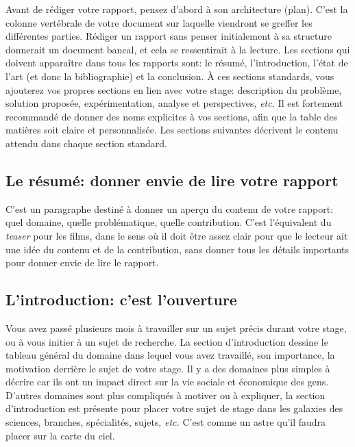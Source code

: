 \documentclass{rapport}
\def\etc{\textit{etc.}\xspace}
\begin{document}
      Avant de rédiger votre rapport, pensez d'abord à son architecture (plan). C'est la colonne vertébrale de votre document sur laquelle viendront se greffer les différentes parties. Rédiger un rapport sans penser initialement à sa structure donnerait un document bancal, et cela se ressentirait à la lecture. Les sections qui doivent apparaître dans tous les rapports sont: le résumé, l'introduction, l'état de l'art (et donc la bibliographie) et la conclusion. À ces sections standards, vous ajouterez vos propres sections en lien avec votre stage: description du problème, solution proposée, expérimentation, analyse et perspectives, \etc Il est fortement recommandé de donner des noms explicites à vos sections, afin que la table des matières soit claire et personnalisée. %
      Les sections suivantes décrivent le contenu attendu dans chaque section standard. 
      
      \subsection{Le résumé: donner envie de lire votre rapport} 
        C'est un paragraphe destiné à donner un aperçu du contenu de votre rapport: quel domaine, quelle problématique, quelle contribution. C'est l'équivalent du {\it teaser} pour les films, dans le sens où il doit être assez clair pour que le lecteur ait une idée du contenu et de la contribution, sans donner tous les détails importants pour  donner envie de lire le rapport.
      
      \subsection{L'introduction: c'est l'ouverture} 
        Vous avez passé plusieurs mois à travailler sur un sujet précis durant votre stage, ou à vous initier à un sujet de recherche. La section d'introduction dessine le tableau général du domaine dans lequel vous avez travaillé, son importance, la motivation derrière le sujet de votre stage. Il y a des domaines plus simples à décrire car ils ont un impact direct sur la vie sociale et économique des gens. D'autres domaines sont plus compliqués à motiver ou à expliquer, la section d'introduction est présente pour placer votre sujet de stage dans les galaxies des sciences, branches, spécialités, sujets, \etc C'est comme un astre qu'il faudra placer sur la carte du ciel.
        
\end{document}
